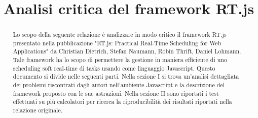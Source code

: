 \documentclass[conference]{IEEEtran}
\begin{document}
\title{Analisi critica del framework RT.js}

\author{
}

\maketitle

\begin{abstract}
Lo scopo della seguente relazione è analizzare in modo critico il framework RT.js presentato nella pubblicazione "RT.js: Practical Real-Time Scheduling for Web Applications" da Christian Dietrich, Stefan Naumann, Robin Thrift, Daniel Lohmann. Tale framework ha lo scopo di permettere la gestione in maniera efficiente di uno scheduling soft real-time di tasks usando come linguaggio Javascript.
\newline
Questo documento si divide nelle seguenti parti. Nella sezione I si trova un'analisi dettagliata dei problemi riscontrati dagli autori nell'ambiente Javascript e la descrizione del framework proposto con le sue astrazioni. Nella sezione II sono riportati i test effettuati su più calcolatori per ricerca la riproducibilità dei risultati riportati nella relazione originale.
\end{abstract}
\end{document}
